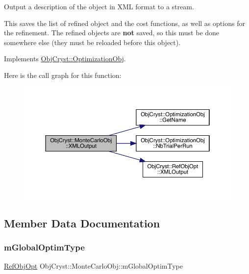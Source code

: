 Output a description of the object in X\+ML format to a stream. 

This saves the list of refined object and the cost functions, as well as options for the refinement. The refined objects are {\bfseries{not}} saved, so this must be done somewhere else (they must be reloaded before this object). 

Implements \mbox{\hyperlink{class_obj_cryst_1_1_optimization_obj_a6b7726159bb0d5dad1c7eebaee78f53a}{Obj\+Cryst\+::\+Optimization\+Obj}}.

Here is the call graph for this function\+:
\nopagebreak
\begin{figure}[H]
\begin{center}
\leavevmode
\includegraphics[width=350pt]{class_obj_cryst_1_1_monte_carlo_obj_a540de9354fcb298fca0458f041238f6e_cgraph}
\end{center}
\end{figure}


\subsection{Member Data Documentation}
\mbox{\label{class_obj_cryst_1_1_monte_carlo_obj_af5ab36ab840b6654f6738c30712b2f95}} 
\subsubsection{\texorpdfstring{mGlobalOptimType}{mGlobalOptimType}}
{\footnotesize\ttfamily \mbox{\hyperlink{class_obj_cryst_1_1_ref_obj_opt}{Ref\+Obj\+Opt}} Obj\+Cryst\+::\+Monte\+Carlo\+Obj\+::m\+Global\+Optim\+Type\hspace{0.3cm}{\ttfamily [protected]}}

